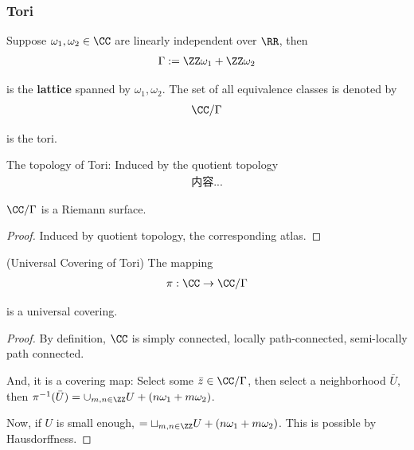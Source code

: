 \documentclass[Total.tex]{subfiles}
\begin{document}
			\subsubsection{Tori}
			\begin{Def}
				Suppose $\omega_1,\omega_2\in \CC$ are linearly independent over $\RR$, then
				\begin{gather*}
					\Gamma:=\ZZ\omega_1+\ZZ\omega_2
				\end{gather*}
				
				is the \textbf{lattice} spanned by $\omega_1,\omega_2$. The set of all equivalence classes is denoted by
				\begin{gather*}
					\CC/\Gamma
				\end{gather*}
				
				is the tori. 
			\end{Def}
			
			The topology of Tori: Induced by the quotient topology
			\begin{gather*}
				内容...
			\end{gather*}
			
			\begin{lemma}
				$\CC/\Gamma$ is a Riemann surface.
			\end{lemma}
			\begin{proof}
				Induced by quotient topology, the corresponding atlas. 
			\end{proof}
			
			\begin{lemma}
				(Universal Covering of Tori) The mapping
				\begin{gather*}
					\pi:\CC\rightarrow \CC/\Gamma
				\end{gather*}
				
				is a universal covering.
			\end{lemma}
			\begin{proof}
				By definition, $\CC$ is simply connected, locally path-connected, semi-locally path connected. 
				
				And, it is a covering map: Select some $\bar{z}\in \CC/\Gamma$, then select a neighborhood $\bar{U}$, then $\pi^{-1}(\bar{U})=\cup_{m,n\in \ZZ} U+(n\omega_1+m\omega_2)$. 
				
				Now, if $U$ is small enough, $=\sqcup_{m,n\in \ZZ} U+(n\omega_1+m\omega_2)$. This is possible by Hausdorffness. 
			\end{proof}
			
\end{document}
